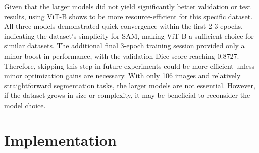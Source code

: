 \documentclass[letterpaper, 10 pt, conference]{ieeeconf}  %
\begin{document}
Given that the larger models did not yield significantly better validation or test results, using ViT-B shows to be more resource-efficient for this specific dataset. All three models demonstrated quick convergence within the first 2-3 epochs, indicating the dataset's simplicity for SAM, making ViT-B a sufficient choice for similar datasets. The additional final 3-epoch training session provided only a minor boost in performance, with the validation Dice score reaching 0.8727. Therefore, skipping this step in future experiments could be more efficient unless minor optimization gains are necessary. With only 106 images and relatively straightforward segmentation tasks, the larger models are not essential. However, if the dataset grows in size or complexity, it may be beneficial to reconsider the model choice.

\section{Implementation}

\begin{table}[h]
\centering
\caption{Comparison of Original SAM and CedarSAM (Fine-tuned Models) for Various Metrics}
\label{tab:model_comparison}
\end{table}
\end{document}
